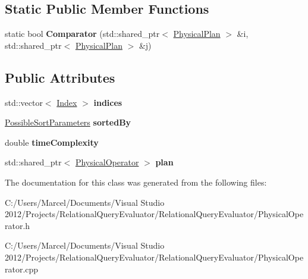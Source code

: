 \subsection*{Static Public Member Functions}
\begin{DoxyCompactItemize}
\item 
\hypertarget{class_physical_plan_a8bb776a471914b831e60924f629df4e4}{static bool {\bfseries Comparator} (std\+::shared\+\_\+ptr$<$ \hyperlink{class_physical_plan}{Physical\+Plan} $>$ \&i, std\+::shared\+\_\+ptr$<$ \hyperlink{class_physical_plan}{Physical\+Plan} $>$ \&j)}\label{class_physical_plan_a8bb776a471914b831e60924f629df4e4}

\end{DoxyCompactItemize}
\subsection*{Public Attributes}
\begin{DoxyCompactItemize}
\item 
\hypertarget{class_physical_plan_a4d8ba56ef7d228a2a11176da541af5ef}{std\+::vector$<$ \hyperlink{class_index}{Index} $>$ {\bfseries indices}}\label{class_physical_plan_a4d8ba56ef7d228a2a11176da541af5ef}

\item 
\hypertarget{class_physical_plan_a6a49fcbbcb8e22d1f573106de5847c45}{\hyperlink{class_possible_sort_parameters}{Possible\+Sort\+Parameters} {\bfseries sorted\+By}}\label{class_physical_plan_a6a49fcbbcb8e22d1f573106de5847c45}

\item 
\hypertarget{class_physical_plan_a2176d32a64b58406206181395c4127bc}{double {\bfseries time\+Complexity}}\label{class_physical_plan_a2176d32a64b58406206181395c4127bc}

\item 
\hypertarget{class_physical_plan_a97349262f468410057d66f00334003a5}{std\+::shared\+\_\+ptr$<$ \hyperlink{class_physical_operator}{Physical\+Operator} $>$ {\bfseries plan}}\label{class_physical_plan_a97349262f468410057d66f00334003a5}

\end{DoxyCompactItemize}


The documentation for this class was generated from the following files\+:\begin{DoxyCompactItemize}
\item 
C\+:/\+Users/\+Marcel/\+Documents/\+Visual Studio 2012/\+Projects/\+Relational\+Query\+Evaluator/\+Relational\+Query\+Evaluator/Physical\+Operator.\+h\item 
C\+:/\+Users/\+Marcel/\+Documents/\+Visual Studio 2012/\+Projects/\+Relational\+Query\+Evaluator/\+Relational\+Query\+Evaluator/Physical\+Operator.\+cpp\end{DoxyCompactItemize}
